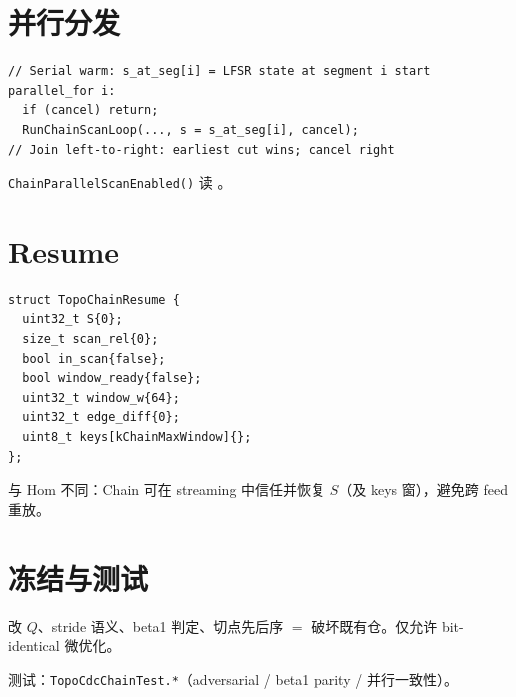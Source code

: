 \section{并行分发}

\begin{lstlisting}[caption={并行语义草图},label={lst:chain-par}]
// Serial warm: s_at_seg[i] = LFSR state at segment i start
parallel_for i:
  if (cancel) return;
  RunChainScanLoop(..., s = s_at_seg[i], cancel);
// Join left-to-right: earliest cut wins; cancel right
\end{lstlisting}

\texttt{ChainParallelScanEnabled()} 读 。

\section{Resume}

\begin{lstlisting}[caption={TopoChainResume},label={lst:chain-resume}]
struct TopoChainResume {
  uint32_t S{0};
  size_t scan_rel{0};
  bool in_scan{false};
  bool window_ready{false};
  uint32_t window_w{64};
  uint32_t edge_diff{0};
  uint8_t keys[kChainMaxWindow]{};
};
\end{lstlisting}

与 Hom 不同：Chain 可在 streaming 中信任并恢复 $S$（及 keys 窗），避免跨 feed 重放。

\section{冻结与测试}

\begin{warnbox}[切点冻结]
改 $Q$、stride 语义、beta1 判定、切点先后序 $=$ 破坏既有仓。仅允许 bit-identical 微优化。
\end{warnbox}

测试：\texttt{TopoCdcChainTest.*}（adversarial / beta1 parity / 并行一致性）。
